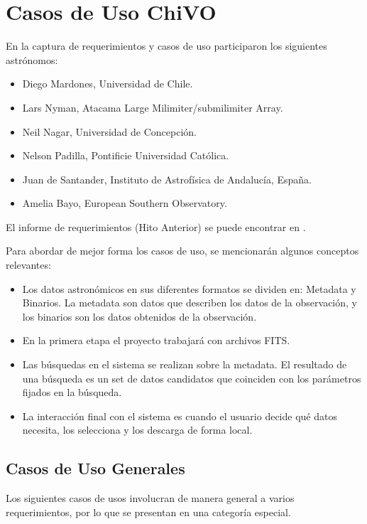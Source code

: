 \section{Casos de Uso ChiVO}
\noindent En la captura de requerimientos y casos de uso participaron los siguientes
astrónomos:
\begin{itemize}
	\item Diego Mardones, Universidad de Chile.
	\item Lars Nyman, Atacama Large Milimiter/submilimiter Array.
	\item Neil Nagar, Universidad de Concepción.
	\item Nelson Padilla, Pontificie Universidad Católica. 
	\item Juan de Santander, Instituto de Astrofísica de Andalucía, España.
	\item Amelia Bayo, European Southern Observatory.
\end{itemize}

\noindent El informe de requerimientos (Hito Anterior) se puede encontrar en
\cite{hrequerimientos}.

\noindent Para abordar de mejor forma los casos de uso, se mencionarán algunos
conceptos relevantes:
\begin{itemize}
	\item Los datos astronómicos en sus diferentes formatos se dividen en:
Metadata y Binarios. La metadata son datos que describen los datos de la
observación, y los binarios son los datos obtenidos de la observación.
	\item En la primera etapa el proyecto trabajará con archivos FITS.
	\item Las búsquedas en el sistema se realizan sobre la metadata. El
resultado de una búsqueda es un set de datos candidatos que coinciden con los
parámetros fijados en la búsqueda.
	\item La interacción final con el sistema es cuando el usuario decide qué
datos necesita, los selecciona y los descarga de forma local.
\end{itemize}

\subsection{Casos de Uso Generales}
Los siguientes casos de usos involucran de manera general a varios
requerimientos, por lo que se presentan en una categoría especial. 

